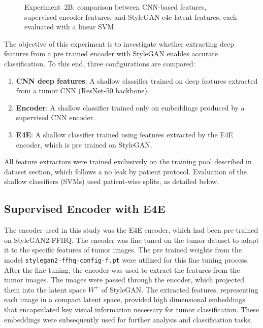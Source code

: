 \begin{figure}[ht]
{%
}
\caption{Experiment~2B: comparison between CNN-based features, supervised encoder features, and StyleGAN e4e latent features, each evaluated with a linear SVM.}
\label{fig:exp2b_two_rows_cnn_encoder}
\end{figure}


The objective of this experiment is to investigate whether extracting deep features from a pre trained encoder with StyleGAN enables accurate classification. To this end, three configurations are compared:

\begin{enumerate}
    \item \textbf{CNN deep features}: A shallow classifier trained on deep features extracted from a tumor CNN (ResNet-50 backbone).
    \item \textbf{Encoder}: A shallow classifier trained only on embeddings produced by a supervised CNN encoder.
    \item \textbf{E4E}: A shallow classifier trained using features extracted by the E4E encoder, which is pre trained on StyleGAN.
\end{enumerate}

All feature extractors were trained exclusively on the training pool described in dataset section, which follows a no leak by patient protocol. Evaluation of the shallow classifiers (SVMs) used patient-wise splits, as detailed below.


\subsection{Supervised Encoder with E4E}

The encoder used in this study was the E4E encoder, which had been pre-trained on StyleGAN2-FFHQ. The encoder was fine tuned on the tumor dataset to adapt it to the specific features of tumor images. The pre trained weights from the model \texttt{stylegan2-ffhq-config-f.pt} were utilized for this fine tuning process.\\

After the fine tuning, the encoder was used to extract the features from the tumor images. The images were passed through the encoder, which projected them into the latent space \( W^+ \) of StyleGAN. The extracted features, representing each image in a compact latent space, provided high dimensional embeddings that encapsulated key visual information necessary for tumor classification. These embeddings were subsequently used for further analysis and classification tasks.


